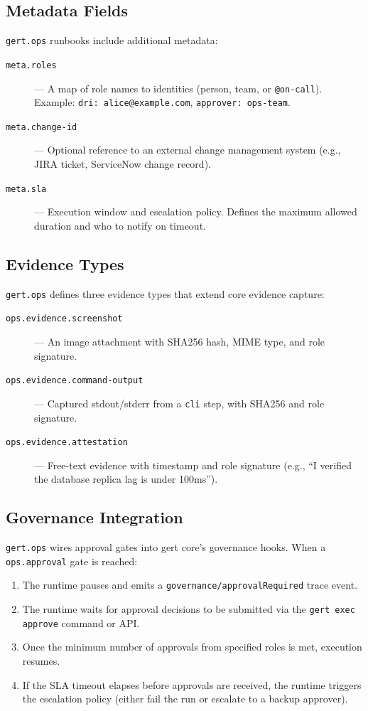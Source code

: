\subsection{Metadata Fields}

\texttt{gert.ops} runbooks include additional metadata:

\begin{description}
  \item[\texttt{meta.roles}] — A map of role names to identities (person, team, or \texttt{@on-call}). Example: \texttt{dri: alice@example.com}, \texttt{approver: ops-team}.
  \item[\texttt{meta.change-id}] — Optional reference to an external change management system (e.g., JIRA ticket, ServiceNow change record).
  \item[\texttt{meta.sla}] — Execution window and escalation policy. Defines the maximum allowed duration and who to notify on timeout.
\end{description}

\subsection{Evidence Types}

\texttt{gert.ops} defines three evidence types that extend core evidence capture:

\begin{description}
  \item[\texttt{ops.evidence.screenshot}] — An image attachment with SHA256 hash, MIME type, and role signature.
  \item[\texttt{ops.evidence.command-output}] — Captured stdout/stderr from a \texttt{cli} step, with SHA256 and role signature.
  \item[\texttt{ops.evidence.attestation}] — Free-text evidence with timestamp and role signature (e.g., ``I verified the database replica lag is under 100ms'').
\end{description}

\subsection{Governance Integration}

\texttt{gert.ops} wires approval gates into gert core's governance hooks. When a \texttt{ops.approval} gate is reached:

\begin{enumerate}
  \item The runtime pauses and emits a \texttt{governance/approvalRequired} trace event.
  \item The runtime waits for approval decisions to be submitted via the \texttt{gert exec approve} command or API.
  \item Once the minimum number of approvals from specified roles is met, execution resumes.
  \item If the SLA timeout elapses before approvals are received, the runtime triggers the escalation policy (either fail the run or escalate to a backup approver).
\end{enumerate}

